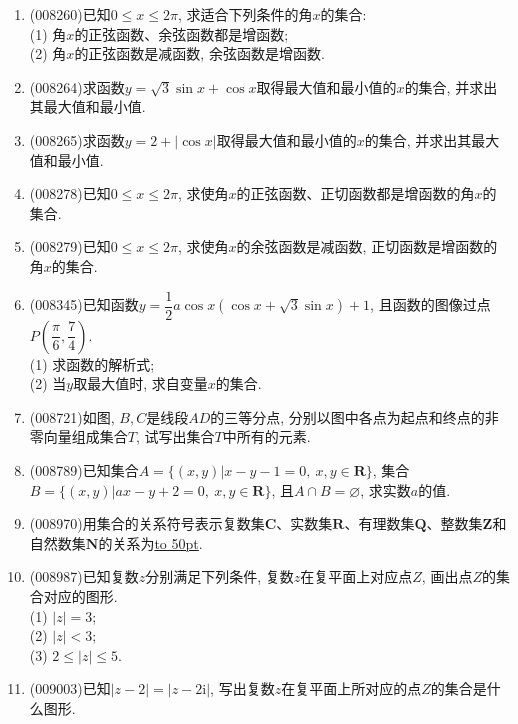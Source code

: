 \documentclass[10pt,a4paper]{article}
\newcommand{\blank}[1]{\underline{\hbox to #1pt{}}}
\begin{document}
\begin{enumerate}[1.]
\item {\tiny (008260)}已知$0\le x\le 2\pi$, 求适合下列条件的角$x$的集合:\\
(1) 角$x$的正弦函数、余弦函数都是增函数;\\
(2) 角$x$的正弦函数是减函数, 余弦函数是增函数.
\item {\tiny (008264)}求函数$y=\sqrt 3\sin x+\cos x$取得最大值和最小值的$x$的集合, 并求出其最大值和最小值.
\item {\tiny (008265)}求函数$y=2+|\cos x|$取得最大值和最小值的$x$的集合, 并求出其最大值和最小值.
\item {\tiny (008278)}已知$0\le x\le 2\pi$, 求使角$x$的正弦函数、正切函数都是增函数的角$x$的集合.
\item {\tiny (008279)}已知$0\le x\le 2\pi$, 求使角$x$的余弦函数是减函数, 正切函数是增函数的角$x$的集合.
\item {\tiny (008345)}已知函数$y=\dfrac 12a\cos x(\cos x+\sqrt 3\sin x)+1$, 且函数的图像过点$P(\dfrac{\pi}6,\dfrac 74)$.\\
(1) 求函数的解析式;\\
(2) 当$y$取最大值时, 求自变量$x$的集合.
\item {\tiny (008721)}如图, $B,C$是线段$AD$的三等分点, 分别以图中各点为起点和终点的非零向量组成集合$T$, 试写出集合$T$中所有的元素.
\begin{center}
\end{center}
\item {\tiny (008789)}已知集合$A=\{(x,y)|x-y-1=0,\ x,y\in \mathbf{R}\}$, 集合$B=\{(x,y)|ax-y+2=0,\ x,y\in \mathbf{R}\}$, 且$A\cap B=\varnothing$, 求实数$a$的值.
\item {\tiny (008970)}用集合的关系符号表示复数集$\mathbf{C}$、实数集$\mathbf{R}$、有理数集$\mathbf{Q}$、整数集$\mathbf{Z}$和自然数集$\mathbf{N}$的关系为\blank{50}.
\item {\tiny (008987)}已知复数$z$分别满足下列条件, 复数$z$在复平面上对应点$Z$, 画出点$Z$的集合对应的图形.\\
(1) $|z|=3$;\\ 
(2) $|z|<3$;\\
(3) $2\le|z|\le 5$.
\item {\tiny (009003)}已知$|z-2|=|z-2\mathrm{i}|$, 写出复数$z$在复平面上所对应的点$Z$的集合是什么图形.

\end{enumerate}
\end{document}
